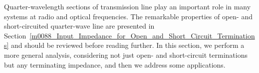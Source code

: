 

\label{m0091_Quarter-Wavelength_Transmission_Line} %

Quarter-wavelength sections of transmission line play an important role in many systems at radio and optical frequencies. 
The remarkable properties of open- and short-circuited quarter-wave line are presented in Section~\ref{m0088_Input_Impedance_for_Open_and_Short_Circuit_Terminations} and should be reviewed before reading further.
In this section, we perform a more general analysis, considering not just open- and short-circuit terminations but any terminating impedance, and then we address some applications.

